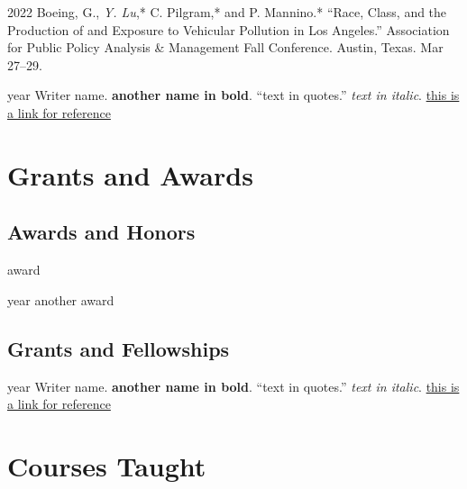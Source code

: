 \documentclass[12pt,letterpaper]{report}
\begin{document}
    \begin{tablist}

        \item[2022] \tab{}Boeing, G., \textit{Y. Lu},* C. Pilgram,* and P. Mannino.* \enquote{Race, Class, and the Production of and Exposure to Vehicular Pollution in Los Angeles.} Association for Public Policy Analysis \& Management Fall Conference. Austin, Texas. Mar 27--29.

        \item[year] \tab{}Writer name. \textbf{another name in bold}. \enquote{text in quotes.} \textit{text in italic}. \href{https://this.is.a.link}{this is a link for reference}

    \end{tablist}



    \section*{Grants and Awards}

    \subsection*{Awards and Honors}

    \begin{tablist}

        \item[\the\year] \tab{}award
        \item[year] \tab{}another award
        

    \end{tablist}

    \subsection*{Grants and Fellowships}

    \begin{tablist}

        \item[year] \tab{}Writer name. \textbf{another name in bold}. \enquote{text in quotes.} \textit{text in italic}. \href{https://this.is.a.link}{this is a link for reference}

    \end{tablist}



    \section*{Courses Taught}
\end{document}
